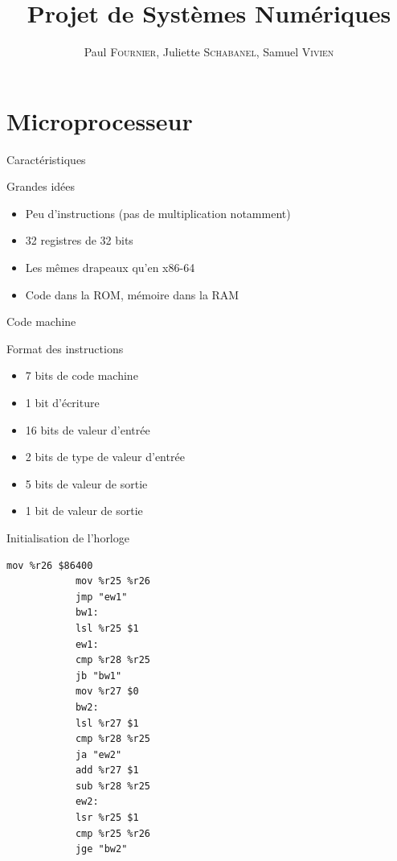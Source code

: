 \documentclass[intlimits, 10pt]{beamer}
\title[\textsc{Ernest'O'Clock}]{Projet de Systèmes Numériques}
\date{}
\author[\textsc{Fournier}, \textsc{Schabanel}, \textsc{Vivien}]{Paul \textsc{Fournier}, Juliette \textsc{Schabanel}, Samuel \textsc{Vivien}}
\begin{document}
	
	\maketitle	
	
	\begin{frame}
		\tableofcontents
	\end{frame}
	
	\section{Microprocesseur}
	
	\begin{frame}{Caractéristiques}
		\begin{block}{Grandes idées}
			\begin{itemize}
				\item Peu d'instructions (pas de multiplication notamment)
				\item 32 registres de 32 bits
				\item Les mêmes drapeaux qu'en x86-64
				\item Code dans la ROM, mémoire dans la RAM
			\end{itemize}
		\end{block}
	\end{frame}
	
	\begin{frame}{Code machine}
		\begin{block}{Format des instructions}
			\begin{itemize}	
				\item 7 bits de code machine
				\item 1 bit d'écriture
				\item 16 bits de valeur d'entrée
				\item 2 bits de type de valeur d'entrée
				\item 5 bits de valeur de sortie
				\item 1 bit de valeur de sortie
			\end{itemize}
		\end{block}
	\end{frame}
	
	\begin{frame}{Initialisation de l'horloge}
		\begin{lstlisting}[language={[x86masm]Assembler},morekeywords={lsr}, caption="Division euclidienne"]
			mov %r26 $86400
			mov %r25 %r26
			jmp "ew1"
			bw1:
			lsl %r25 $1
			ew1:
			cmp %r28 %r25
			jb "bw1"
			mov %r27 $0
			bw2:
			lsl %r27 $1
			cmp %r28 %r25
			ja "ew2"
			add %r27 $1
			sub %r28 %r25
			ew2:
			lsr %r25 $1
			cmp %r25 %r26
			jge "bw2"
		\end{lstlisting}
	\end{frame}
	
\end{document}
